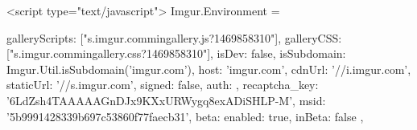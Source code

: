         <script type="text/javascript">
            Imgur.Environment = {
                galleryScripts:             ["\/\/s.imgur.com\/min\/gallery.js?1469858310"],
                galleryCSS:                 ["\/\/s.imgur.com\/min\/gallery.css?1469858310"],
                isDev:                      false,
                isSubdomain:                Imgur.Util.isSubdomain('imgur.com'),
                host:                       'imgur.com',
                cdnUrl:                     '//i.imgur.com',
                staticUrl:                  '//s.imgur.com',
                signed:                     false,
                auth:                       {},
                recaptcha_key:              '6LdZsh4TAAAAAGnDJx9KXxURWygq8exADiSHLP-M',
                msid:                       '5b9991428339b697c53860f77faecb31',
                beta:                       {
                    enabled: true,
                    inBeta:  false
                },
                
}
